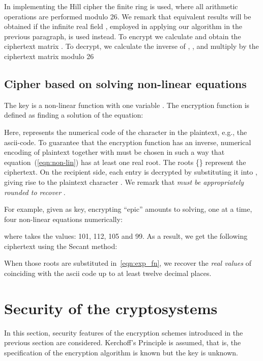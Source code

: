 \documentclass[10pt,journal]{IEEEtran}
\begin{document}
In implementing the Hill cipher the finite ring  
is used, where all arithmetic operations are performed modulo
26. We remark that equivalent results will be obtained if the infinite 
real field , employed in applying our algorithm in the 
previous paragraph, is used instead. To encrypt we calculate 
 and obtain the ciphertext matrix
. To decrypt, we calculate the inverse of ,
,
and multiply by the ciphertext matrix modulo 26


 
  
\subsection{Cipher based on solving non-linear equations}
\label{sec:solving_non_linear_eqns}
The key is a non-linear function with one variable . The encryption 
function is defined as finding a solution of the equation:
 
Here,  represents the numerical code of the  character
in the plaintext, e.g., the ascii-code. To guarantee that the
encryption function has an inverse, numerical encoding of plaintext
together with  must be chosen in such a way that
equation~(\ref{eqn:non-lin}) has at least one real root. The roots
\{\} represent the ciphertext. On the recipient side, each
entry  is decrypted by substituting it into , giving
rise to the plaintext character .  We remark that
\emph{{ must be appropriately rounded to recover }}.
\newline

For example, given  as key, encrypting ``epic'' amounts to solving, one at a time, 
four non-linear equations numerically: 

where  takes the values: 101, 112, 105 and 99. 
As a result, we get the following ciphertext using the Secant method:

\footnotesize
 
\normalsize

\noindent When those roots are substituted in~\ref{eqn:exp_fn}, we recover the \emph{real values}
of  coinciding with the ascii code up to at least 
twelve decimal places.

\section{Security of the cryptosystems} 
\label{sec:security}
In this section, security features of the encryption schemes
introduced in the previous section are considered. Kerchoff's
Principle is assumed, that is, the specification of the encryption
algorithm is known but the key is unknown.
\newline 
    
\end{document}
